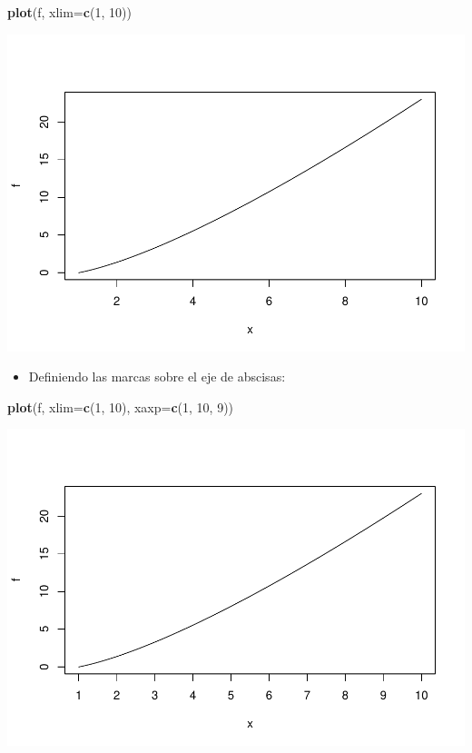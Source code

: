 \documentclass[
]{book}
\newenvironment{Shaded}{\begin{snugshade}}{\end{snugshade}}
\newcommand{\DataTypeTok}[1]{\textcolor[rgb]{0.13,0.29,0.53}{#1}}
\newcommand{\DecValTok}[1]{\textcolor[rgb]{0.00,0.00,0.81}{#1}}
\newcommand{\KeywordTok}[1]{\textcolor[rgb]{0.13,0.29,0.53}{\textbf{#1}}}
\newcommand{\NormalTok}[1]{#1}
\providecommand{\tightlist}{%
  \setlength{\itemsep}{0pt}\setlength{\parskip}{0pt}}
\theoremstyle{definition}
\theoremstyle{definition}
\theoremstyle{definition}
\theoremstyle{remark}
\begin{document}
\begin{Shaded}
\begin{Highlighting}[]
\KeywordTok{plot}\NormalTok{(f, }\DataTypeTok{xlim=}\KeywordTok{c}\NormalTok{(}\DecValTok{1}\NormalTok{, }\DecValTok{10}\NormalTok{))}
\end{Highlighting}
\end{Shaded}

\begin{center}\includegraphics[width=0.9\linewidth]{07chap06_Graficos_I_files/figure-latex/unnamed-chunk-17-1} \end{center}

\begin{itemize}
\tightlist
\item
  Definiendo las marcas sobre el eje de abscisas:
\end{itemize}

\begin{Shaded}
\begin{Highlighting}[]
\KeywordTok{plot}\NormalTok{(f, }\DataTypeTok{xlim=}\KeywordTok{c}\NormalTok{(}\DecValTok{1}\NormalTok{, }\DecValTok{10}\NormalTok{), }\DataTypeTok{xaxp=}\KeywordTok{c}\NormalTok{(}\DecValTok{1}\NormalTok{, }\DecValTok{10}\NormalTok{, }\DecValTok{9}\NormalTok{))}
\end{Highlighting}
\end{Shaded}

\begin{center}\includegraphics[width=0.9\linewidth]{07chap06_Graficos_I_files/figure-latex/unnamed-chunk-18-1} \end{center}
\end{document}
